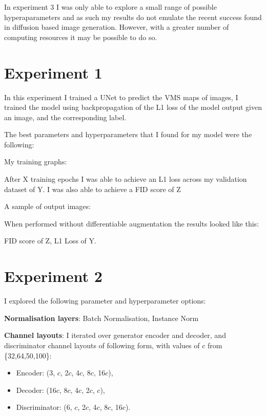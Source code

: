 \documentclass{UoYCSproject}
\begin{document}
In experiment 3 I was only able to explore a small range of possible hyperaparameters and as such my results do not emulate the recent success found in diffusion based image generation.
However, with a greater number of computing resources it may be possible to do so.

\section{Experiment 1}

In this experiment I trained a UNet to predict the VMS maps of images, I trained the model using backpropagation of the L1 loss of the model output given an image, and the corresponding label. 

The best parameters and hyperparameters that I found for my model were the following:

My training graphs:

After X training epochs I was able to achieve an L1 loss across my validation dataset of Y.
I was also able to achieve a FID score of Z

A sample of output images:

When performed without differentiable augmentation the results looked like this:

FID score of Z, L1 Loss of Y.

\section{Experiment 2}

I explored the following parameter and hyperparameter options:

\textbf{Normalisation layers}: Batch Normalisation, Instance Norm

\textbf{Channel layouts}:
I iterated over generator encoder and decoder, and discriminator channel layouts of following form, with values of $c$ from \{32,64,50,100\}:
\begin{itemize}
\item Encoder: (3, $c$, 2$c$, 4$c$, 8$c$, 16$c$), 
\item Decoder: (16$c$, 8$c$, 4$c$, 2$c$, $c$),
\item Discriminator: (6, $c$, 2$c$, 4$c$, 8$c$, 16$c$).
\end{itemize}
\end{document}
